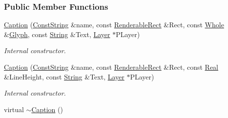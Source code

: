 \subsubsection*{Public Member Functions}
\begin{DoxyCompactItemize}
\item 
\hyperlink{classMezzanine_1_1UI_1_1Caption_ad0dc49d641507e277174b4f2a3562a89}{Caption} (\hyperlink{namespaceMezzanine_a63cd699ac54b73953f35ec9cfc05e506}{ConstString} \&name, const \hyperlink{structMezzanine_1_1UI_1_1RenderableRect}{RenderableRect} \&Rect, const \hyperlink{namespaceMezzanine_adcbb6ce6d1eb4379d109e51171e2e493}{Whole} \&\hyperlink{classMezzanine_1_1UI_1_1Glyph}{Glyph}, const \hyperlink{namespaceMezzanine_acf9fcc130e6ebf08e3d8491aebcf1c86}{String} \&Text, \hyperlink{classMezzanine_1_1UI_1_1Layer}{Layer} $\ast$PLayer)
\begin{DoxyCompactList}\small\item\em Internal constructor. \item\end{DoxyCompactList}\item 
\hyperlink{classMezzanine_1_1UI_1_1Caption_a1604f65f43a488ef3f24f59ce300aa9a}{Caption} (\hyperlink{namespaceMezzanine_a63cd699ac54b73953f35ec9cfc05e506}{ConstString} \&name, const \hyperlink{structMezzanine_1_1UI_1_1RenderableRect}{RenderableRect} \&Rect, const \hyperlink{namespaceMezzanine_a726731b1a7df72bf3583e4a97282c6f6}{Real} \&LineHeight, const \hyperlink{namespaceMezzanine_acf9fcc130e6ebf08e3d8491aebcf1c86}{String} \&Text, \hyperlink{classMezzanine_1_1UI_1_1Layer}{Layer} $\ast$PLayer)
\begin{DoxyCompactList}\small\item\em Internal constructor. \item\end{DoxyCompactList}\item 
\hypertarget{classMezzanine_1_1UI_1_1Caption_a3b6b1682c67c591ee4e19ed9e9dded74}{
virtual \hyperlink{classMezzanine_1_1UI_1_1Caption_a3b6b1682c67c591ee4e19ed9e9dded74}{$\sim$Caption} ()}
\label{classMezzanine_1_1UI_1_1Caption_a3b6b1682c67c591ee4e19ed9e9dded74}


\end{DoxyCompactItemize}
